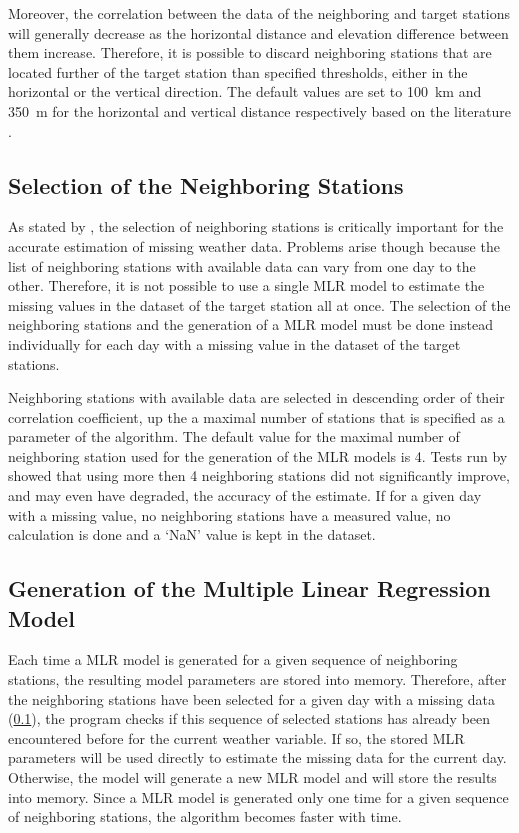 \documentclass[TechnicalNoteMeteo.tex]{subfiles}
\begin{document}
Moreover, the correlation between the data of the neighboring and target stations will generally decrease as the horizontal distance and elevation difference between them increase. Therefore, it is possible to discard neighboring stations that are located further of the target station than specified thresholds, either in the horizontal or the vertical direction. The default values are set to \SI{100}{km} and \SI{350}{m} for the horizontal and vertical distance respectively based on the literature \cite{tronci_comparison_1986,xia_forest_1999,simolo_improving_2010}.


\subsection{Selection of the Neighboring Stations}\label{sec:select_stations}

As stated by \cite{eischeid_creating_2000}, the selection of neighboring stations is critically important for the accurate estimation of missing weather data. Problems arise though because the list of neighboring stations with available data can vary from one day to the other. Therefore, it is not possible to use a single MLR model to estimate the missing values in the dataset of the target station all at once. The selection of the neighboring stations and the generation of a MLR model must be done instead individually for each day with a missing value in the dataset of the target stations.

Neighboring stations with available data are selected in descending order of their correlation coefficient, up the a maximal number of stations that is specified as a parameter of the algorithm. The default value for the maximal number of neighboring station used for the generation of the MLR models is 4. Tests run by \cite{eischeid_creating_2000} showed that using more then 4 neighboring stations did not significantly improve, and may even have degraded, the accuracy of the estimate. If for a given day with a missing value, no neighboring stations have a measured value, no calculation is done and a ‘NaN' value is kept in the dataset. 

\subsection{Generation of the Multiple Linear Regression Model}

Each time a MLR model is generated for a given sequence of neighboring stations, the resulting model parameters are stored into memory. Therefore, after the neighboring stations have been selected for a given day with a missing data (\cref{sec:select_stations}), the program checks if this sequence of selected stations has already been encountered before for the current weather variable. If so, the stored MLR parameters will be used directly to estimate the missing data for the current day. Otherwise, the model will generate a new MLR model and will store the results into memory. Since a MLR model is generated only one time for a given sequence of neighboring stations, the algorithm becomes faster with time.
\end{document}
